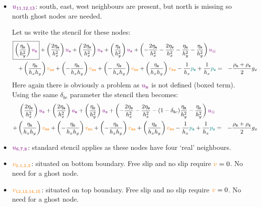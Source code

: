 \begin{itemize}
\item ${\color{violet} u_{\tt 11,12,13}}$: south, east, west neighbours are present, but north is missing so north ghost nodes are needed.

Let us write the stencil for these nodes:
\begin{eqnarray}
\boxed{\left( \frac{\eta_{\tt n}}{h_y^2} \right) {\color{violet} u_{\tt n}}} + 
\left( \frac{2\eta_{\tt e}}{h_x^2} \right) {\color{violet} u_{\tt e}} + 
\left( \frac{2\eta_{\tt w}}{h_x^2} \right) {\color{violet} u_{\tt w}} + 
\left( \frac{\eta_{\tt s}}{h_y^2} \right) {\color{violet} u_{\tt s}} + 
\left( -\frac{2\eta_{\tt e}}{h_x^2} -\frac{2\eta_{\tt w}}{h_x^2}  
-\frac{\eta_{\tt n}}{h_y^2} -\frac{\eta_{\tt s}}{h_y^2}  
\right) {\color{violet} u_\otimes} \nonumber\\
+
\left( \frac{\eta_{\tt n}}{h_x h_y} \right) {\color{orange} v_{\tt ne}}+ 
\left(-\frac{\eta_{\tt n}}{h_x h_y} \right) {\color{orange} v_{\tt nw}}+ 
\left(-\frac{\eta_{\tt s}}{h_x h_y} \right) {\color{orange} v_{\tt se}}+ 
\left( \frac{\eta_{\tt s}}{h_x h_y} \right) {\color{orange} v_{\tt sw}} 
- \frac{1}{h_x} {\color{teal}p_{\tt e}} + \frac{1}{h_x} {\color{teal}p_{\tt w}} 
&=& -\frac{\rho_{\tt n}+\rho_{\tt s}}{2} g_x \nonumber
\end{eqnarray}
Here again there is obviously a problem as ${\color{violet} u_{\tt n}}$ is not defined (boxed term).
Using the same $\delta_{bc}$ parameter the stencil then becomes:
\begin{eqnarray}
\left( \frac{2\eta_{\tt e}}{h_x^2} \right) {\color{violet} u_{\tt e}} + 
\left( \frac{2\eta_{\tt w}}{h_x^2} \right) {\color{violet} u_{\tt w}} + 
\left( \frac{\eta_{\tt s}}{h_y^2} \right) {\color{violet} u_{\tt s}} + 
\left( -\frac{2\eta_{\tt e}}{h_x^2} -\frac{2\eta_{\tt w}}{h_x^2}  
-(1-\delta_{bc})\frac{\eta_{\tt n}}{h_y^2} -\frac{\eta_{\tt s}}{h_y^2}  
\right) {\color{violet} u_\otimes} \nonumber\\
+
\left( \frac{\eta_{\tt n}}{h_x h_y} \right) {\color{orange} v_{\tt ne}}+ 
\left(-\frac{\eta_{\tt n}}{h_x h_y} \right) {\color{orange} v_{\tt nw}}+ 
\left(-\frac{\eta_{\tt s}}{h_x h_y} \right) {\color{orange} v_{\tt se}}+ 
\left( \frac{\eta_{\tt s}}{h_x h_y} \right) {\color{orange} v_{\tt sw}} 
- \frac{1}{h_x} {\color{teal}p_{\tt e}} + \frac{1}{h_x} {\color{teal}p_{\tt w}} 
&=& -\frac{\rho_{\tt n}+\rho_{\tt s}}{2} g_x \nonumber
\end{eqnarray}



\item ${\color{violet} u_{\tt 6,7,8}}$: standard stencil applies as 
these nodes have four `real' neighbours.
\item ${\color{orange} v_{\tt 0,1,2,3}}$: situated on bottom boundary. Free slip and no slip require ${\color{orange} v}=0$. No need for a ghost node.
\item ${\color{orange} v_{\tt 12,13,14,15}}$: situated on top boundary. Free slip and no slip require ${\color{orange} v}=0$. No need for a ghost node.


\end{itemize}
